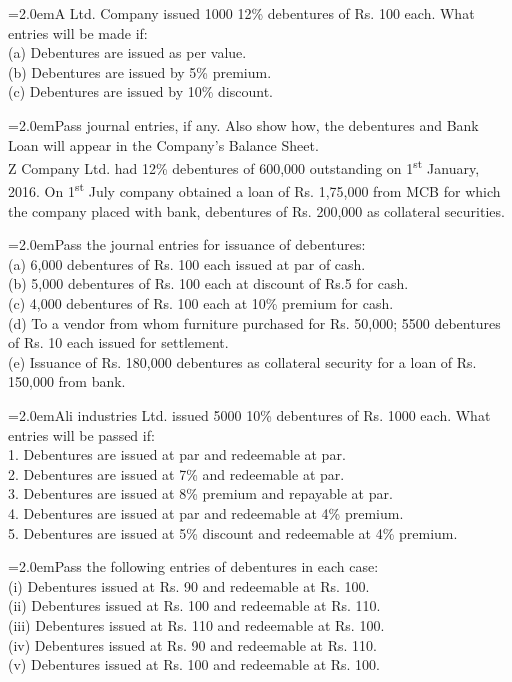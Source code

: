 \documentclass[11pt,a4paper]{article}
\newcommand{\lqn}[2]{\Needspace{6\baselineskip}\par\medskip\noindent\hangindent=2.0em\hangafter=1\makebox[2.0em][l]{\textbf{#1.}}#2\par}
\begin{document}
\lqn{55}{A Ltd. Company issued 1000 12\% debentures of Rs. 100 each. What entries will be made if:\\
(a) Debentures are issued as per value.\\
(b)  Debentures are issued by 5\% premium.\\
(c)  Debentures are issued by 10\% discount.\par
}
\lqn{56}{Pass journal entries, if any. Also show how, the debentures and Bank Loan will appear in the Company’s Balance Sheet.\\
Z Company Ltd. had 12\% debentures of 600,000 outstanding on 1\textsuperscript{st}  January, 2016. On 1\textsuperscript{st}  July company obtained a loan of Rs. 1,75,000 from MCB for which the company placed with bank, debentures of Rs. 200,000 as collateral securities.\par
}
\lqn{57}{Pass the journal entries for issuance of debentures:\\
(a) 6,000 debentures of Rs. 100 each issued at par of cash.\\
(b) 5,000 debentures of Rs. 100 each at discount of Rs.5 for cash.\\
(c) 4,000 debentures of Rs. 100 each at 10\% premium for cash.\\
(d) To a vendor from whom furniture purchased for Rs. 50,000; 5500 debentures of Rs. 10 each issued for settlement.\\
(e) Issuance of Rs. 180,000 debentures as collateral security for a loan of Rs. 150,000 from bank.\par
}
\lqn{58}{Ali industries Ltd. issued 5000 10\% debentures of Rs. 1000 each. What entries will be passed if:\\
1.  Debentures are issued at par and redeemable at par.\\
2.  Debentures are issued at 7\% and redeemable at par.\\
3.  Debentures are issued at 8\% premium and repayable at par.\\
4.  Debentures are issued at par and redeemable at 4\% premium.\\
5.  Debentures are issued at 5\% discount and redeemable at 4\% premium.\par
}
\lqn{59}{Pass the following entries of debentures in each case:\\
(i)  Debentures issued at Rs. 90 and redeemable at Rs. 100.\\
(ii)  Debentures issued at Rs. 100 and redeemable at Rs. 110.\\
(iii)  Debentures issued at Rs. 110 and redeemable at Rs. 100.\\
(iv)  Debentures issued at Rs. 90 and redeemable at Rs. 110.\\
(v)  Debentures issued at Rs. 100 and redeemable at Rs. 100.\par
}
\end{document}
